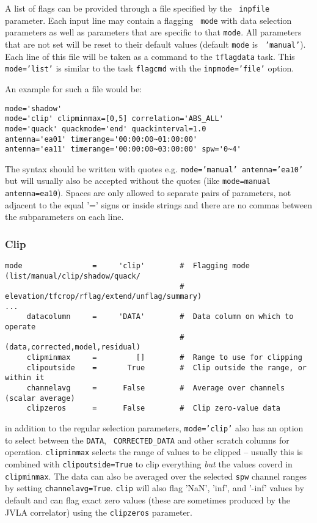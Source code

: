 A list of flags can be provided through a file specified by the {\tt
  inpfile} parameter.  Each input line may contain a flagging {\tt
  mode} with data selection parameters as well as parameters that are
specific to that {\tt mode}. All parameters that are not set will be
reset to their default values (default {\tt mode} is {\tt
  'manual'}). Each line of this file will be taken as a command to the
{\tt tflagdata} task. This {\tt mode='list'} is similar to the task
{\tt flagcmd} with the {\tt inpmode='file'} option.

An example for such a file would be: 

\small
\begin{verbatim}
mode='shadow'
mode='clip' clipminmax=[0,5] correlation='ABS_ALL'
mode='quack' quackmode='end' quackinterval=1.0
antenna='ea01' timerange='00:00:00~01:00:00'
antenna='ea11' timerange='00:00:00~03:00:00' spw='0~4'
\end{verbatim}
\normalsize

The syntax should be written with quotes e.g. {\tt mode='manual'
  antenna='ea10'} but will usually also be accepted without the quotes
(like {\tt mode=manual antenna=ea10}). Spaces are only allowed to
separate pairs of parameters, not adjacent to the equal '=' signs or
inside strings and there are no commas between the subparameters on each line.




\subsubsection{Clip}
\label{section:edit.tflagdata.mode.clip}

\small
\begin{verbatim}
mode                =     'clip'        #  Flagging mode (list/manual/clip/shadow/quack/
                                        #  elevation/tfcrop/rflag/extend/unflag/summary)
...
     datacolumn     =     'DATA'        #  Data column on which to operate
                                        #   (data,corrected,model,residual)
     clipminmax     =         []        #  Range to use for clipping
     clipoutside    =       True        #  Clip outside the range, or within it
     channelavg     =      False        #  Average over channels (scalar average)
     clipzeros      =      False        #  Clip zero-value data
\end{verbatim}
\normalsize

in addition to the regular selection parameters, {\tt mode='clip'}
also has an option to select between the {\tt DATA}, {\tt
  CORRECTED\_DATA} and other scratch columns for 
operation. {\tt clipminmax} selects the range of values to be clipped
-- usually this is combined with {\tt clipoutside=True} to clip
everything {\it but} the values coverd in {\tt clipminmax}. The data can
also be averaged over the selected {\tt spw} channel ranges by setting
{\tt channelavg=True}. {\tt clip} will also flag 'NaN', 'inf', and
'-inf' values by default and can flag exact zero values (these are sometimes
produced by the JVLA correlator) using the {\tt clipzeros} parameter.


